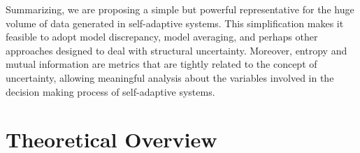 Summarizing, we are proposing a simple but powerful representative for the huge volume of data generated in self-adaptive systems. This simplification makes it feasible to adopt model discrepancy, model averaging, and perhaps other approaches designed to deal with structural uncertainty. Moreover, entropy and mutual information are metrics that are tightly related to the concept of uncertainty, allowing meaningful analysis about the variables involved in the decision making process of self-adaptive systems.  

%

\section{Theoretical Overview}

